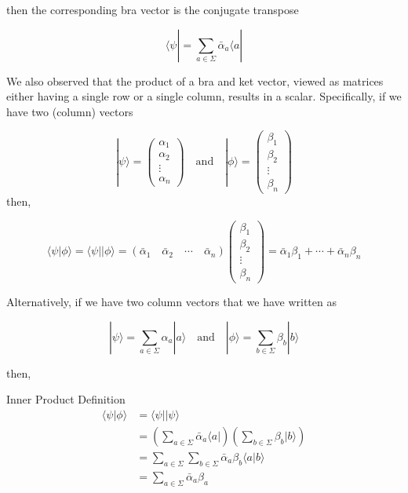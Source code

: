 \documentclass[svgnames]{article}     %
\begin{document}
then the corresponding bra vector is the conjugate transpose

\[
\langle \psi | = \sum_{a\in\Sigma} \bar\alpha_a \langle a | 
\] \vspace{5px}

We also observed that the product of a bra and ket vector, viewed as matrices
either having a single row or a single column, results in a scalar.
Specifically, if we have two (column) vectors

\[
|\psi\rangle = \begin{pmatrix}
  \alpha_1 \\ \alpha_2 \\ \vdots \\ \alpha_n
\end{pmatrix} \quad \text{and} \quad |\phi\rangle = \begin{pmatrix}
  \beta_1 \\ \beta_2 \\ \vdots \\ \beta_n
\end{pmatrix} 
\] \vspace{5px}
then, 

\[
\langle \psi | \phi \rangle = \langle \psi | |\phi\rangle = (\bar\alpha_1 \quad \bar\alpha_2 \quad \cdots \quad \bar\alpha_n) \begin{pmatrix}
  \beta_1 \\ \beta_2 \\ \vdots \\ \beta_n
\end{pmatrix} = \bar\alpha_1 \beta_1 + \cdots + \bar\alpha_n \beta_n
\] \vspace{5px}

Alternatively, if we have two column vectors that we have written as 

\[
|\psi\rangle = \sum_{a\in\Sigma} \alpha_a |a\rangle \quad \text{and} \quad |\phi\rangle = \sum_{b\in\Sigma} \beta_b |b\rangle 
\] \vspace{5px}

then, 

\begin{mainbox}{Inner Product Definition}
\begin{align*}
  \langle \psi | \phi \rangle &= \langle \psi | |\psi\rangle \\
                              &= \left( \sum_{a\in\Sigma} \bar\alpha_a \langle a |\right) \left( \sum_{b\in\Sigma} \beta_b |b\rangle  \right) \\ 
                              &= \sum_{a\in\Sigma} \sum_{b\in\Sigma} \bar\alpha_a \beta_b \langle a | b\rangle \\ 
                              &= \sum_{a\in\Sigma} \bar\alpha_a \beta_a
\end{align*}
\end{mainbox}
\end{document}
